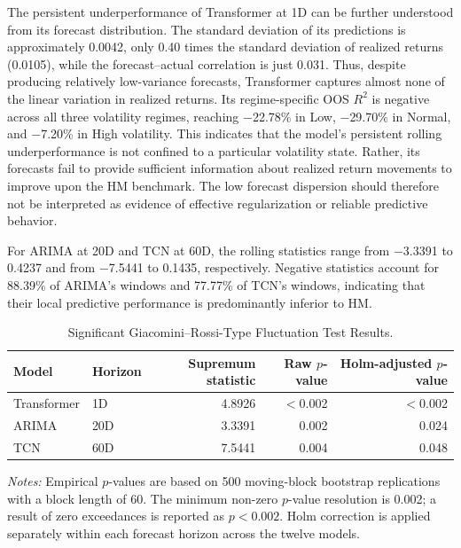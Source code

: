 \documentclass[12pt,twoside]{ord}
\begin{document}
The persistent underperformance of Transformer at 1D can be further understood from its forecast distribution. The standard deviation of its predictions is approximately 0.0042, only 0.40 times the standard deviation of realized returns (0.0105), while the forecast--actual correlation is just 0.031. Thus, despite producing relatively low-variance forecasts, Transformer captures almost none of the linear variation in realized returns. Its regime-specific OOS $R^2$ is negative across all three volatility regimes, reaching $-$22.78\% in Low, $-$29.70\% in Normal, and $-$7.20\% in High volatility. This indicates that the model's persistent rolling underperformance is not confined to a particular volatility state. Rather, its forecasts fail to provide sufficient information about realized return movements to improve upon the HM benchmark. The low forecast dispersion should therefore not be interpreted as evidence of effective regularization or reliable predictive behavior.

For ARIMA at 20D and TCN at 60D, the rolling statistics range from $-$3.3391 to 0.4237 and from $-$7.5441 to 0.1435, respectively. Negative statistics account for 88.39\% of ARIMA's windows and 77.77\% of TCN's windows, indicating that their local predictive performance is predominantly inferior to HM.

\begin{table}[htbp]
\centering
\caption{Significant Giacomini--Rossi-Type Fluctuation Test Results.}\label{tab:h3_fluctuation_sig}
\setlength{\tabcolsep}{5pt}
\begin{tabular}{llrrr}
\hline
Model & Horizon & Supremum statistic & Raw $p$-value & Holm-adjusted $p$-value \\
\hline
Transformer & 1D  & 4.8926 & $<$0.002 & $<$0.002 \\
ARIMA       & 20D & 3.3391 & 0.002    & 0.024 \\
TCN         & 60D & 7.5441 & 0.004    & 0.048 \\
\hline
\end{tabular}
\par\vspace{4pt}\parbox{\linewidth}{\fontsize{9pt}{12pt}\selectfont\textit{Notes:} Empirical $p$-values are based on 500 moving-block bootstrap replications with a block length of 60. The minimum non-zero $p$-value resolution is 0.002; a result of zero exceedances is reported as $p<0.002$. Holm correction is applied separately within each forecast horizon across the twelve models.}
\end{table}
\end{document}
